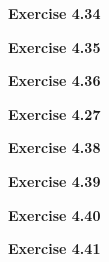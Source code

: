 \documentclass{article}
\begin{document}
\bigskip

\begin{framed}
    \noindent \textbf{Exercise 4.34}
    
    \medskip
    
    
\end{framed}


\bigskip

\begin{framed}
    \noindent \textbf{Exercise 4.35}
    
    \medskip
    
    
\end{framed}


\bigskip

\begin{framed}
    \noindent \textbf{Exercise 4.36}
    
    \medskip
    
    
\end{framed}


\bigskip

\begin{framed}
    \noindent \textbf{Exercise 4.27}
    
    \medskip
    
    
\end{framed}


\bigskip

\begin{framed}
    \noindent \textbf{Exercise 4.38}
    
    \medskip
    
    
\end{framed}


\bigskip

\begin{framed}
    \noindent \textbf{Exercise 4.39}
    
    \medskip
    
    
\end{framed}


\bigskip

\begin{framed}
    \noindent \textbf{Exercise 4.40}
    
    \medskip
    
    
\end{framed}


\bigskip

\begin{framed}
    \noindent \textbf{Exercise 4.41}
    
    \medskip
    
    
\end{framed}
\end{document}
